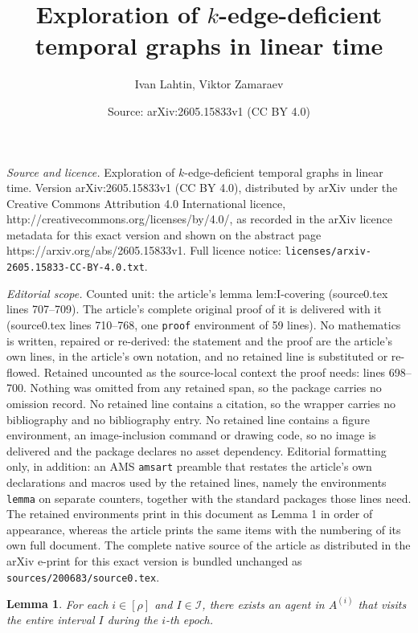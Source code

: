 \documentclass[10pt,a4paper]{amsart}
\title{Exploration of $k$-edge-deficient temporal graphs in linear time}
\author{Ivan Lahtin, Viktor Zamaraev}
\date{Source: arXiv:2605.15833v1 (CC BY 4.0)}
\newtheorem{lemma}{Lemma}
\newcommand{\bfI}{\ensuremath{\mathcal{I}}}
\begin{document}
\maketitle

\noindent\emph{Source and licence.} Exploration of $k$-edge-deficient temporal graphs in linear time. Version arXiv:2605.15833v1 (CC BY 4.0), distributed by arXiv under the Creative Commons Attribution 4.0 International licence, http://creativecommons.org/licenses/by/4.0/, as recorded in the arXiv licence metadata for this exact version and shown on the abstract page https://arxiv.org/abs/2605.15833v1. Full licence notice: \texttt{licenses/arxiv-2605.15833-CC-BY-4.0.txt}.\par\smallskip

\noindent\textit{Editorial scope.} Counted unit: the article's lemma lem:I-covering (source0.tex lines 707--709). The article's complete original proof of it is delivered with it (source0.tex lines 710--768, one \texttt{proof} environment of 59 lines). No mathematics is written, repaired or re-derived: the statement and the proof are the article's own lines, in the article's own notation, and no retained line is substituted or re-flowed.  Retained uncounted as the source-local context the proof needs: lines 698--700.  Nothing was omitted from any retained span, so the package carries no omission record.  No retained line contains a citation, so the wrapper carries no bibliography and no bibliography entry.  No retained line contains a figure environment, an image-inclusion command or drawing code, so no image is delivered and the package declares no asset dependency.  Editorial formatting only, in addition: an AMS \texttt{amsart} preamble that restates the article's own declarations and macros used by the retained lines, namely the environments \texttt{lemma} on separate counters, together with the standard packages those lines need.  The retained environments print in this document as Lemma 1 in order of appearance, whereas the article prints the same items with the numbering of its own full document.  The complete native source of the article as distributed in the arXiv e-print for this exact version is bundled unchanged as \texttt{sources/200683/source0.tex}.
    \begin{lemma}\label{lem:visited-interval}
        For each $i \in [\rho]$ and $I \in \bfI$,  there exists an agent in $A^{(i)}$ that visits the entire interval $I$ during the $i$-th epoch.
    \end{lemma}
\end{document}
